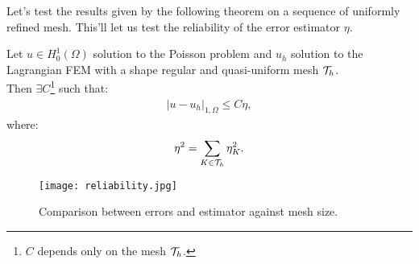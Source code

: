 Let's test the results given by the following theorem on a sequence of uniformly refined mesh. This'll let us test the reliability of the error estimator $\eta$.

\begin{theorem}[Reliability]
	Let $u \in H_0^1(\Omega)$ solution to the Poisson problem and $u_h$ solution to the Lagrangian FEM with a shape regular and quasi-uniform mesh $\mathcal{T}_h$. \\
	Then $\exists C$\footnote{$C$ depends only on the mesh $\mathcal{T}_h$.} such that:
	\begin{gather}
		\lvert u - u_h \rvert_{1, \Omega} \leq C \eta,
	\end{gather}
	where:
	\begin{gather}
		\eta^2 = \sum_{K \in \mathcal{T}_h} \eta_K^2.
	\end{gather}
\end{theorem}

\begin{figure}[!ht]
	\centering
	\texttt{[image: reliability.jpg]}
	\caption{Comparison between errors and estimator against mesh size.}
\end{figure}

\newpage

